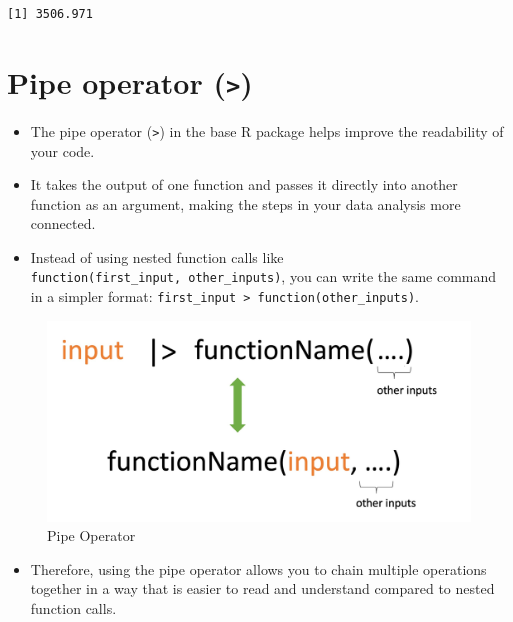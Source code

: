 \documentclass[
  letterpaper,
  DIV=11,
  numbers=noendperiod]{scrreprt}
\providecommand{\tightlist}{%
  \setlength{\itemsep}{0pt}\setlength{\parskip}{0pt}}\usepackage{longtable,booktabs,array}
\begin{document}
\begin{verbatim}
[1] 3506.971
\end{verbatim}

\section{\texorpdfstring{Pipe operator
(\texttt{\textbar{}\textgreater{}})}{Pipe operator (\textbar\textgreater)}}\label{pipe-operator}

\begin{itemize}
\item
  The pipe operator (\texttt{\textbar{}\textgreater{}}) in the base R
  package helps improve the readability of your code.
\item
  It takes the output of one function and passes it directly into
  another function as an argument, making the steps in your data
  analysis more connected.
\item
  Instead of using nested function calls like
  \texttt{function(first\_input,\ other\_inputs)}, you can write the
  same command in a simpler format:
  \texttt{first\_input\ \textbar{}\textgreater{}\ function(other\_inputs)}.
\end{itemize}

\begin{figure}[H]

{\centering \includegraphics[width=1\textwidth,height=\textheight]{fig/4_pipeillustration.png}

}

\caption{Pipe Operator}

\end{figure}%

\begin{itemize}
\tightlist
\item
  Therefore, using the pipe operator allows you to chain multiple
  operations together in a way that is easier to read and understand
  compared to nested function calls.
\end{itemize}
\end{document}
